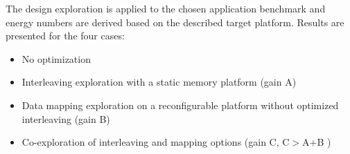 \documentclass[prodmode,acmtodaes]{acmsmall}
\begin{document}
The design exploration is applied to the chosen application benchmark and energy numbers are derived based on the described target platform.
Results are presented for the four cases:
\begin{itemize}
\item No optimization
\item Interleaving exploration with a static memory platform (gain A)
\item Data mapping exploration on a reconfigurable platform without optimized interleaving (gain B)
\item Co-exploration of interleaving and mapping options (gain C, C$ > $A+B )
\end{itemize}



\end{document}
